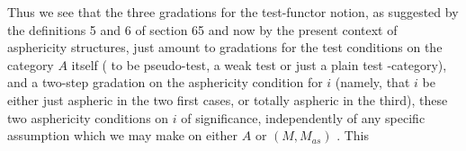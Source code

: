 Thus we see that the three gradations for the test-functor notion,
as suggested by the definitions 5 and 6 of section 65 and now by the
present context of asphericity structures, just amount to gradations 
for the test conditions on the category $A$ itself ( to be  pseudo-test, a
weak test or just a plain test -category), and a two-step gradation on
the asphericity condition for $i$ (namely, that $i$ be either just aspheric
in the two first cases, or totally aspheric in the third),  these two
asphericity conditions on $i$   of significance,  independently of
any specific assumption which we may make on either $A$ or $(M,M_{as})$ . This

